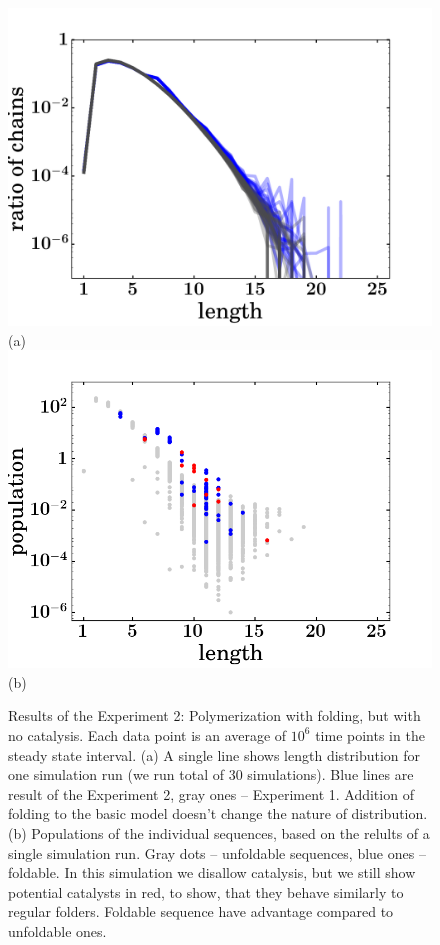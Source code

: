 \documentclass[journal=jacsat,manuscript=article,layout=twocolumn]{achemso}
\begin{document}
\begin{figure}[hbt!]
  \centering
  \includegraphics[width=0.9\columnwidth]{pictures/distr-folded-many.pdf} (a)
   \includegraphics[width=0.9\columnwidth]{pictures/scatter209.png}(b)
  \caption{\footnotesize{Results of the Experiment 2: Polymerization with folding, but with no 
catalysis. Each data point is an average of $10^6$ time points in the steady state interval. (a) 
A single line shows length distribution for one simulation run (we run total of 30 simulations). 
Blue lines are result of the Experiment 2, gray ones -- Experiment 1. Addition of folding to the 
basic model doesn't change the nature of distribution. (b) Populations of the individual sequences, 
based on the relults of a single simulation run. Gray dots -- unfoldable sequences, blue ones -- 
foldable. In this simulation we disallow catalysis, but we still show potential catalysts in red, to 
show, that they 
behave similarly to regular folders. Foldable sequence have advantage compared to unfoldable ones.}}
  \label{fig:sim.flory-fold}
\end{figure}
\end{document}

